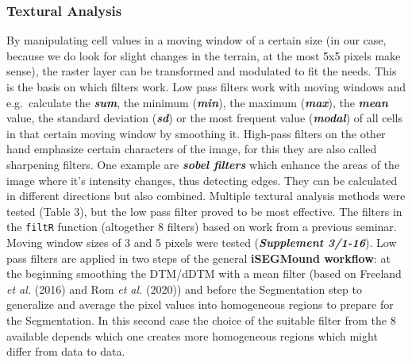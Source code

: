 \documentclass[
  12pt,
]{article}
\begin{document}
\hypertarget{textural-analysis}{%
\subsubsection{\texorpdfstring{\textbf{Textural Analysis}}{Textural Analysis}}\label{textural-analysis}}

By manipulating cell values in a moving window of a certain size (in our case, because we do look for slight changes in the terrain, at the most 5x5 pixels make sense), the raster layer can be transformed and modulated to fit the needs. This is the basis on which filters work.
Low pass filters work with moving windows and e.g.~calculate the \textbf{\emph{sum}}, the minimum (\textbf{\emph{min}}), the maximum (\textbf{\emph{max}}), the \textbf{\emph{mean}} value, the standard deviation (\textbf{\emph{sd}}) or the most frequent value (\textbf{\emph{modal}}) of all cells in that certain moving window by smoothing it. High-pass filters on the other hand emphasize certain characters of the image, for this they are also called sharpening filters. One example are \textbf{\emph{sobel filters}} which enhance the areas of the image where it's intensity changes, thus detecting edges. They can be calculated in different directions but also combined. Multiple textural analysis methods were tested (Table 3), but the low pass filter proved to be most effective.
The filters in the \texttt{filtR} function (altogether 8 filters) based on work from a previous seminar. Moving window sizes of 3 and 5 pixels were tested (\textbf{\emph{Supplement 3/1-16}}).
Low pass filters are applied in two steps of the general \textbf{iSEGMound workflow}: at the beginning smoothing the DTM/dDTM with a mean filter (based on Freeland \emph{et al.} (2016) and Rom \emph{et al.} (2020)) and before the Segmentation step to generalize and average the pixel values into homogeneous regions to prepare for the Segmentation. In this second case the choice of the suitable filter from the 8 available depends which one creates more homogeneous regions which might differ from data to data.
\end{document}
